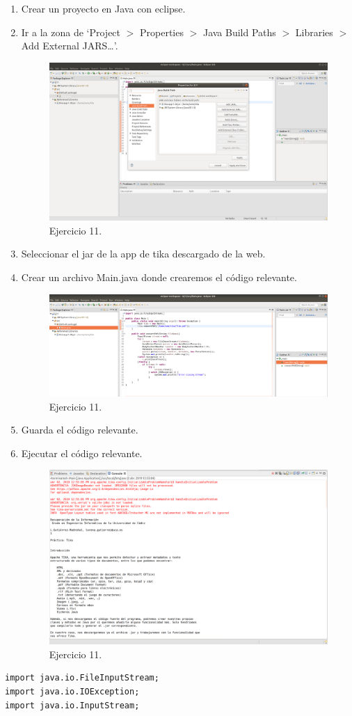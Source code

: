 \documentclass{article}
\begin{document}
\begin{enumerate}
\begin{enumerate}
            \item Crear un proyecto en Java con eclipse.
            \item Ir a la zona de `Project $>$ Properties $>$ Java Build Paths $>$ Libraries $>$ Add External JARS\ldots'.
                \begin{figure}[H]
                \centering
                \includegraphics[width=0.7\linewidth]{./ej18}
                \caption{Ejercicio 11.}
                \end{figure}
            \item Seleccionar el jar de la app de tika descargado de la web.
            \item Crear un archivo Main.java donde crearemos el código relevante.
                \begin{figure}[H]
                \centering
                \includegraphics[width=0.7\linewidth]{./ej19}
                \caption{Ejercicio 11.}
                \end{figure}
            \item Guarda el código relevante.
            \item Ejecutar el código relevante.
                \begin{figure}[H]
                \centering
                \includegraphics[width=0.7\linewidth]{./ej20}
                \caption{Ejercicio 11.}
                \end{figure}
        \end{enumerate}
        \lstset{language=Java, texcl=true}
        \begin{lstlisting}[frame=single]
import java.io.FileInputStream;
import java.io.IOException;
import java.io.InputStream;


\end{lstlisting}
\end{enumerate}
\end{document}

